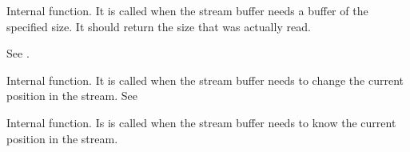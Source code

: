 
Internal function. It is called when the stream buffer needs a buffer of the
specified size. It should return the size that was actually read.



See .



Internal function. It is called when the stream buffer needs to change the
current position in the stream. See 



Internal function. Is is called when the stream buffer needs to know the
current position in the stream.

